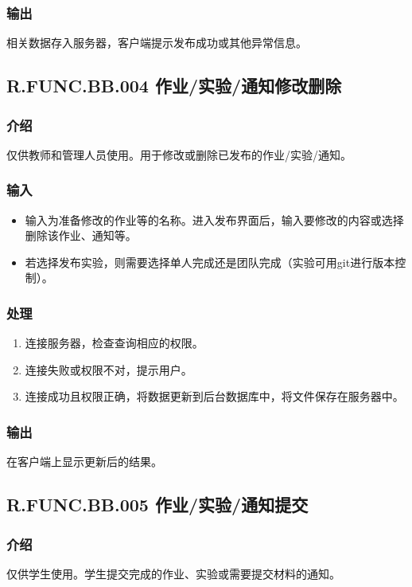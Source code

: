       \subsubsection{输出}
      相关数据存入服务器，客户端提示发布成功或其他异常信息。

    \subsection{R.FUNC.BB.004 作业/实验/通知修改删除}
      \subsubsection{介绍}
      仅供教师和管理人员使用。用于修改或删除已发布的作业/实验/通知。
      \subsubsection{输入}
	    \begin{itemize}
        \item 输入为准备修改的作业等的名称。进入发布界面后，输入要修改的内容或选择删除该作业、通知等。
	      \item 若选择发布实验，则需要选择单人完成还是团队完成（实验可用git进行版本控制）。
      \end{itemize}
      \subsubsection{处理}
      \begin{enumerate}
        \item 连接服务器，检查查询相应的权限。
        \item 连接失败或权限不对，提示用户。
        \item 连接成功且权限正确，将数据更新到后台数据库中，将文件保存在服务器中。
      \end{enumerate}
      \subsubsection{输出}
      在客户端上显示更新后的结果。

    \subsection{R.FUNC.BB.005 作业/实验/通知提交}
      \subsubsection{介绍}
      仅供学生使用。学生提交完成的作业、实验或需要提交材料的通知。

